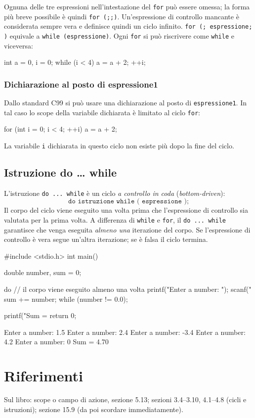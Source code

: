 \documentclass[11pt,a4paper]{article}
\begin{document}
Ognuna delle tre espressioni nell'intestazione del \lstinline|for| può essere omessa; la forma più breve possibile è quindi \lstinline|for (;;)|. Un'espressione di controllo mancante è considerata sempre vera e definisce quindi un ciclo infinito. \lstinline|for (; espressione; )| equivale a \lstinline|while (espressione)|. Ogni \lstinline|for| si può riscrivere come \lstinline|while| e viceversa:
\begin{codice}
int a = 0, i = 0;
while (i < 4)
{
    a = a + 2;
    ++i;
}
\end{codice}

\subsubsection*{Dichiarazione al posto di espressione1}

Dallo standard C99 si può usare una dichiarazione al posto di \texttt{espressione1}. In tal caso lo scope della variabile dichiarata è limitato al ciclo \lstinline|for|:
\begin{codice}
for (int i = 0; i < 4; ++i) {
    a = a + 2;
}
\end{codice}
La variabile \lstinline|i| dichiarata in questo ciclo non esiste più dopo la fine del ciclo.

\subsection{Istruzione do \dots{} while}

L'istruzione \lstinline|do ... while| è un ciclo \emph{a controllo in coda} (\emph{bottom-driven}):
\[
\texttt{do istruzione while ( espressione );}
\]
Il corpo del ciclo viene eseguito una volta prima che l'espressione di controllo sia valutata per la prima volta. A differenza di \lstinline|while| e \lstinline|for|, il \lstinline|do ... while| garantisce che venga eseguita \emph{almeno una} iterazione del corpo. Se l'espressione di controllo è vera segue un'altra iterazione; se è falsa il ciclo termina.

\begin{esempio}
\begin{codice}
#include <stdio.h>
int main()
{
    double number, sum = 0;

    do   // il corpo viene eseguito almeno una volta
    {
        printf("Enter a number: ");
        scanf("%
        sum += number;
    }
    while (number != 0.0);

    printf("Sum = %
    return 0;
}
\end{codice}
\begin{risultato}
Enter a number: 1.5
Enter a number: 2.4
Enter a number: -3.4
Enter a number: 4.2
Enter a number: 0
Sum = 4.70
\end{risultato}
\end{esempio}

\section{Riferimenti}

Sul libro: scope o campo di azione, sezione 5.13; sezioni 3.4--3.10, 4.1--4.8 (cicli e istruzioni); sezione 15.9 (da poi scordare immediatamente).
\end{document}
